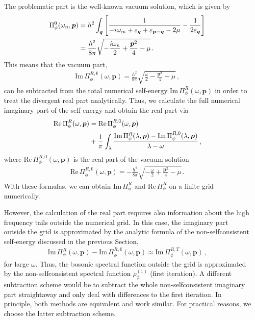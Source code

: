 The problematic part is the well-known vacuum solution, which is given by
%
\begin{align}
\Pi^0_{\phi}(\omega_n, \bm{p}) &= h^2 \int_{\bm{q}} \left[\frac{1}{-i\omega_m+\varepsilon_{\bm{q}}+\varepsilon_{\bm{p-q}}-2\mu} - \frac{1}{2\varepsilon_{\bm{q}}}\right] \notag \\
&= \frac{h^2}{8\pi} \sqrt{-\frac{i\omega_n}{2}+\frac{\bm{p}^2}{4}-\mu}  \,.
\end{align}
%
This means that the vacuum part,
%
\begin{align}
\mathrm{Im}\,\Pi^{R,0}_{\phi}(\omega, \bm{p}) = \frac{h^2}{8\pi} \sqrt{\frac{\omega}{2}-\frac{\bm{p}^2}{4}+\mu}  \,,
\end{align}
%
can be subtracted from the total numerical self-energy $\mathrm{Im}\,\Pi^{R}_{\phi}(\omega, \bm{p})$ in order to treat the divergent real part analytically. Thus, we calculate the full numerical imaginary part of the self-energy and obtain the real part via
%
\begin{align}
\mathrm{Re}\,\Pi^{R}_{\phi}(\omega, \bm{p}) &= \mathrm{Re}\,\Pi^{R,0}_{\phi}(\omega, \bm{p}) \notag \\
&+ \frac{1}{\pi} \int_{\lambda} \frac{\mathrm{Im}\,\Pi^R_{\phi}(\lambda,\bm{p})-\mathrm{Im}\,\Pi^{R,0}_{\phi}(\lambda,\bm{p})}{\lambda-\omega} \,,
\end{align}
%
where $\mathrm{Re}\,\Pi^{R,0}_{\phi}(\omega, \bm{p})$ is the real part of the vacuum solution
%
\begin{align}
\mathrm{Re}\,\Pi^{R,0}_{\phi}(\omega, \bm{p}) = -\frac{h^2}{8\pi} \sqrt{-\frac{\omega}{2}+\frac{\bm{p}^2}{4}-\mu} \,.
\end{align}
%
With these formulas, we can obtain $\mathrm{Im}\,\Pi^{R}_{\phi}$ and $\mathrm{Re}\,\Pi^{R}_{\phi}$ on a finite grid numerically.

However, the calculation of the real part requires also information about the high frequency tails outside the numerical grid. In this case, the imaginary part outside the grid is approximated by the analytic formula of the non-selfconsistent self-energy discussed in the previous Section,
%
\begin{align}
\mathrm{Im}\,\Pi^{R}_{\phi}(\omega, \bm{p})-\mathrm{Im}\,\Pi^{R,0}_{\phi}(\omega, \bm{p}) \approx \mathrm{Im}\,\Pi^{R,T}_{\phi}(\omega, \bm{p}) \,,
\end{align}
%
for large $\omega$. Thus, the bosonic spectral function outside the grid is approximated by the non-selfconsistent spectral function $\rho^{(1)}_{\phi}$ (first iteration). A different subtraction scheme would be to subtract the whole non-selfconsistent imaginary part straightaway and only deal with differences to the first iteration. In principle, both methods are equivalent and work similar. For practical reasons, we choose the latter subtraction scheme.

